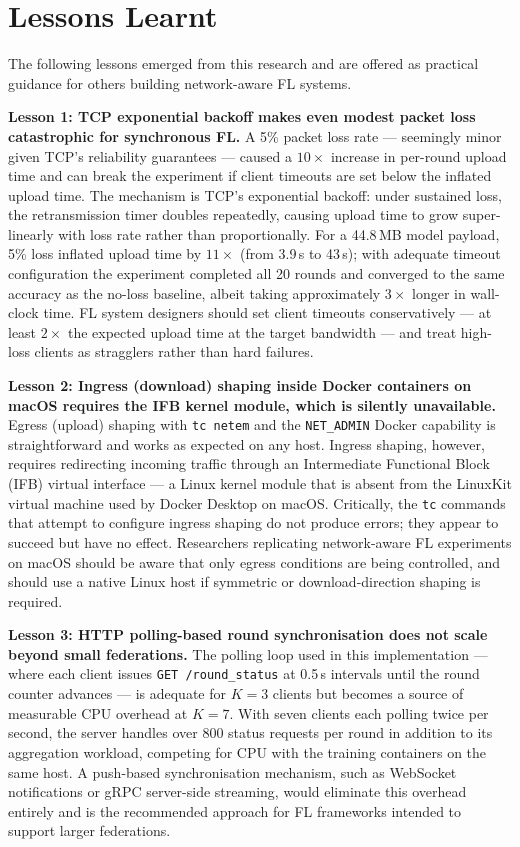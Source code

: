 \documentclass[12pt,a4paper]{report}
\begin{document}
\section{Lessons Learnt}

The following lessons emerged from this research and are offered as
practical guidance for others building network-aware FL systems.

\textbf{Lesson 1: TCP exponential backoff makes even modest packet loss
catastrophic for synchronous FL.}
A 5\% packet loss rate --- seemingly minor given TCP's reliability
guarantees --- caused a $10\times$ increase in per-round upload time and
can break the experiment if client timeouts are set below the inflated
upload time.  The mechanism is TCP's exponential backoff: under sustained
loss, the retransmission timer doubles repeatedly, causing upload time to
grow super-linearly with loss rate rather than proportionally.  For a
44.8\,MB model payload, 5\% loss inflated upload time by $11\times$
(from 3.9\,s to 43\,s); with adequate timeout configuration the
experiment completed all 20 rounds and converged to the same accuracy
as the no-loss baseline, albeit taking approximately $3\times$ longer in
wall-clock time.  FL system designers should set client timeouts
conservatively --- at least $2\times$ the expected upload time at the
target bandwidth --- and treat high-loss clients as stragglers rather
than hard failures.

\textbf{Lesson 2: Ingress (download) shaping inside Docker containers on
macOS requires the IFB kernel module, which is silently unavailable.}
Egress (upload) shaping with \texttt{tc netem} and the \texttt{NET\_ADMIN}
Docker capability is straightforward and works as expected on any host.
Ingress shaping, however, requires redirecting incoming traffic through an
Intermediate Functional Block (IFB) virtual interface --- a Linux kernel
module that is absent from the LinuxKit virtual machine used by Docker
Desktop on macOS.  Critically, the \texttt{tc} commands that attempt to
configure ingress shaping do not produce errors; they appear to succeed
but have no effect.  Researchers replicating network-aware FL experiments
on macOS should be aware that only egress conditions are being controlled,
and should use a native Linux host if symmetric or download-direction
shaping is required.

\textbf{Lesson 3: HTTP polling-based round synchronisation does not scale
beyond small federations.}
The polling loop used in this implementation --- where each client issues
\texttt{GET /round\_status} at 0.5\,s intervals until the round counter
advances --- is adequate for $K = 3$ clients but becomes a source of
measurable CPU overhead at $K = 7$.  With seven clients each polling twice
per second, the server handles over 800 status requests per round in
addition to its aggregation workload, competing for CPU with the training
containers on the same host.  A push-based synchronisation mechanism,
such as WebSocket notifications or gRPC server-side streaming, would
eliminate this overhead entirely and is the recommended approach for FL
frameworks intended to support larger federations.
\end{document}
